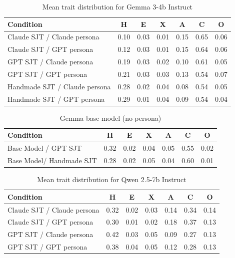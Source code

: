 \documentclass[11pt]{article}
\begin{document}
\begin{table}[!htb]
\centering
\caption{Mean trait distribution for Gemma 3-4b Instruct}
\label{tab:gemma_trait_distribution}
\footnotesize
\renewcommand\arraystretch{1.2}
\begin{tabularx}{\columnwidth}{@{}Xcccccc@{}}
\toprule
\textbf{Condition} & \textbf{H} & \textbf{E} & \textbf{X} & \textbf{A} & \textbf{C} & \textbf{O} \\
\midrule
Claude SJT / Claude persona     & 0.10 & 0.03 & 0.01 & 0.15 & 0.65 & 0.06 \\
Claude SJT / GPT persona        & 0.12 & 0.03 & 0.01 & 0.15 & 0.64 & 0.06 \\
GPT SJT / Claude persona        & 0.19 & 0.03 & 0.02 & 0.10 & 0.61 & 0.05 \\
GPT SJT / GPT persona           & 0.21 & 0.03 & 0.03 & 0.13 & 0.54 & 0.07 \\
Handmade SJT / Claude persona   & 0.28 & 0.02 & 0.04 & 0.08 & 0.54 & 0.05 \\
Handmade SJT / GPT persona      & 0.29 & 0.01 & 0.04 & 0.09 & 0.54 & 0.04 \\
\bottomrule
\end{tabularx}
\end{table}


\begin{table}[!htb]
\centering
\caption{Gemma base model (no persona)}
\label{tab:gemma_base_no_persona}
\footnotesize
\renewcommand\arraystretch{1.2}
\begin{tabularx}{\columnwidth}{@{}Xcccccc@{}}
\toprule
\textbf{Condition} & \textbf{H} & \textbf{E} & \textbf{X} & \textbf{A} & \textbf{C} & \textbf{O} \\
\midrule
Base Model / GPT SJT            & 0.32 & 0.02 & 0.04 & 0.05 & 0.55 & 0.02 \\
Base Model/ Handmade SJT        & 0.28 & 0.02 & 0.05 & 0.04 & 0.60 & 0.01 \\
\bottomrule
\end{tabularx}
\end{table}


\begin{table}[!htb]
\centering
\caption{Mean trait distribution for Qwen 2.5-7b Instruct}
\label{tab:qwen_trait_distribution}
\footnotesize
\renewcommand\arraystretch{1.2}
\begin{tabularx}{\columnwidth}{@{}Xcccccc@{}}
\toprule
\textbf{Condition} & \textbf{H} & \textbf{E} & \textbf{X} & \textbf{A} & \textbf{C} & \textbf{O} \\
\midrule
Claude SJT / Claude persona     & 0.32 & 0.02 & 0.03 & 0.14 & 0.34 & 0.14 \\
Claude SJT / GPT persona        & 0.30 & 0.01 & 0.02 & 0.18 & 0.37 & 0.13 \\
GPT SJT / Claude persona        & 0.42 & 0.03 & 0.05 & 0.09 & 0.27 & 0.13 \\
GPT SJT / GPT persona           & 0.38 & 0.04 & 0.05 & 0.12 & 0.28 & 0.13 \\
\bottomrule
\end{tabularx}
\end{table}
\end{document}
